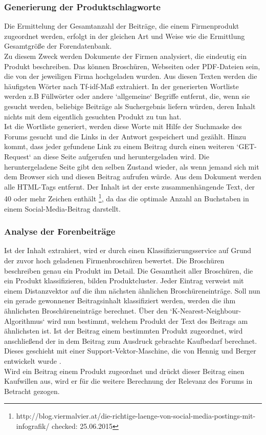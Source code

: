 \subsubsection{Generierung der Produktschlagworte}
Die Ermittelung der Gesamtanzahl der Beiträge, die einem Firmenprodukt zugeordnet werden, erfolgt in der gleichen Art und Weise wie die Ermittlung Gesamtgröße der Forendatenbank.\\
Zu diesem Zweck werden Dokumente der Firmen analysiert, die eindeutig ein Produkt beschreiben. Das können Broschüren, Webseiten oder PDF-Dateien sein, die von der jeweiligen Firma hochgeladen wurden. Aus diesen Texten werden die häufigsten Wörter nach Tf-idf-Maß extrahiert. In der generierten Wortliste werden z.B Füllwörter oder andere `allgemeine` Begriffe entfernt, die, wenn sie gesucht werden,  beliebige Beiträge als Suchergebnis liefern würden, deren Inhalt nichts mit dem eigentlich gesuchten Produkt zu tun hat.\\
Ist die Wortliste generiert, werden diese Worte mit Hilfe der Suchmaske des Forums gesucht und die Links in der Antwort gespeichert und gezählt. Hinzu kommt, dass jeder gefundene Link zu einem Beitrag durch einen weiteren `GET-Request` an diese Seite aufgerufen und heruntergeladen wird. Die heruntergeladene Seite gibt den selben Zustand wieder, als wenn jemand sich mit dem Browser sich und diesen Beitrag aufrufen würde. Aus dem Dokument werden alle HTML-Tags entfernt. Der Inhalt ist der erste zusammenhängende Text, der 40 oder mehr Zeichen enthält \footnote{http://blog.viermalvier.at/die-richtige-laenge-von-social-media-postings-mit-infografik/ checked: 25.06.2015}, da das die optimale Anzahl an Buchstaben in einem Social-Media-Beitrag darstellt.

\subsubsection{Analyse der Forenbeiträge}
Ist der Inhalt extrahiert, wird er durch einen Klassifizierungsservice auf Grund der zuvor hoch geladenen Firmenbroschüren bewertet. Die Broschüren beschreiben genau ein Produkt im Detail. Die Gesamtheit aller Broschüren, die ein Produkt klassifizieren, bilden Produktcluster. Jeder Eintrag verweist mit einem Distanzvektor auf die ihm nächsten ähnlichen Broschüreneinträge. Soll nun ein gerade gewonnener Beitragsinhalt klassifiziert werden, werden die ihm ähnlichsten Broschüreneinträge berechnet. Über den `K-Nearest-Neighbour-Algorithmus` wird nun bestimmt, welchem Produkt der Text des Beitrags am ähnlichsten ist. Ist der Beitrag einem bestimmten Produkt zugeordnet, wird anschließend der in dem Beitrag zum Ausdruck gebrachte Kaufbedarf berechnet. Dieses geschieht mit einer Support-Vektor-Maschine, die von Hennig und Berger entwickelt wurde \cite{n2o}.\\
Wird ein Beitrag einem Produkt zugeordnet und drückt dieser Beitrag einen Kaufwillen aus, wird er für die weitere Berechnung der Relevanz des Forums in Betracht gezogen.

